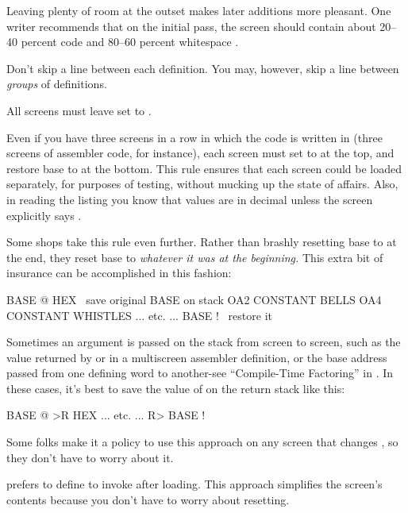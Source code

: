 Leaving plenty of room at the outset makes later additions more
pleasant.  One writer recommends that on the initial pass, the screen
should contain about 20--40 percent code and 80--60 percent
whitespace \cite{stevenson81}.

Don't skip a line between each definition.  You may, however, skip a
line between \emph{groups} of definitions.
\begin{tip}
All screens must leave  set to .
\end{tip}
Even if you have three screens in a row in which the code is written
in  (three screens of assembler code, for instance), each
screen must set  to  at the top, and restore
base to  at the bottom.  This rule ensures that each
screen could be loaded separately, for purposes of testing, without
mucking up the state of affairs.  Also, in reading the listing you
know that values are in decimal unless the screen explicitly
says .

Some shops take this rule even further.  Rather than brashly resetting
base to  at the end, they reset base to \emph{whatever
it was at the beginning.} This extra bit of insurance can be
accomplished in this fashion:
\begin{Code}
BASE @       HEX    \ save original BASE on stack
OA2 CONSTANT BELLS
OA4 CONSTANT WHISTLES
... etc. ...
BASE !              \ restore it
\end{Code}

Sometimes an argument is passed on the stack from screen to screen,
such as the value returned by  or  in a
multiscreen assembler definition, or the base address passed from one
defining word to another-see ``Compile-Time Factoring'' in .
In these cases, it's best to save the value of  on the
return stack like this:
\begin{Code}
BASE @ >R     HEX
... etc. ...
R> BASE !
\end{Code}

Some folks make it a policy to use this approach on any screen that
changes , so they don't have to worry about it.

 prefers to define 
to invoke  after loading.  This approach simplifies the
screen's contents because you don't have to worry about resetting.

